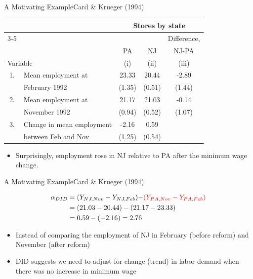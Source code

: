 \documentclass[dvipsnames,hyperref={pdfpagelabels=false}]{beamer}
\begin{document}
\begin{frame}{A Motivating Example}{Card \& Krueger (1994)}
\begin{center}
\begin{threeparttable}
\centering\footnotesize
\begin{tabular}{clccc}
& & \multicolumn{3}{c}{Stores by state}\\
\cmidrule(l){3-5}
& &       &       & Difference, \\
& & PA    & NJ    & NJ-PA \\
\multicolumn{2}{l}{Variable} & (i)   & (ii)  & (iii) \\
\midrule
1.& Mean employment at         & 23.33  & 20.44  & -2.89 \\
&  February 1992             & (1.35) & (0.51) &(1.44) \\
2.& Mean employment at         & 21.17  & 21.03  & -0.14 \\
& November 1992              & (0.94) & (0.52) &(1.07) \\
3.& Change in mean employment  & -2.16  & 0.59   & \color{red}{2.76}   \\
& between Feb and Nov        & (1.25) & (0.54) & \color{red}{(1.44)} \\
\bottomrule
\end{tabular}
\end{threeparttable}
\end{center}
\begin{itemize}
\item Surprisingly, employment rose in NJ relative to PA after the minimum wage change.
\end{itemize}
\end{frame}



\begin{frame}{A Motivating Example}{Card \& Krueger (1994)}
	
	\begin{equation*}
		\begin{aligned}
			\alpha_{DID} &=  (Y_{NJ,Nov} - Y_{NJ,Feb}) {\color{red}- (Y_{PA,Nov} - Y_{PA,Feb})}  \\
			&=    (21.03 - 20.44) - (21.17 - 23.33)  \\
			&=  0.59 - (-2.16)  = 2.76
		\end{aligned}
	\end{equation*}
	\begin{itemize}
		\item Instead of comparing the employment of NJ in February (before reform) and November (after reform)
		\vspace{0.2cm}
		\item DID suggests we need to adjust for change (trend) in labor demand when there was no increase in minimum wage
		
	\end{itemize}
\end{frame}
\end{document}
